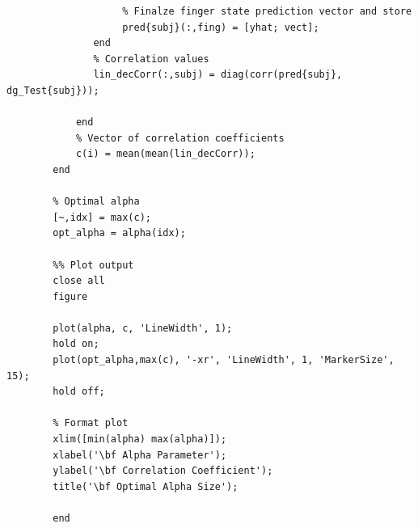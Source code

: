 \documentclass{article}
\begin{document}
\begin{lstlisting}
		            % Finalze finger state prediction vector and store
		            pred{subj}(:,fing) = [yhat; vect];
		       end
		       % Correlation values
		       lin_decCorr(:,subj) = diag(corr(pred{subj}, dg_Test{subj})); 
		       
		    end
		    % Vector of correlation coefficients
			c(i) = mean(mean(lin_decCorr));
		end

		% Optimal alpha 
		[~,idx] = max(c);
		opt_alpha = alpha(idx);

		%% Plot output
		close all
		figure

		plot(alpha, c, 'LineWidth', 1);
		hold on;
		plot(opt_alpha,max(c), '-xr', 'LineWidth', 1, 'MarkerSize', 15);
		hold off;

		% Format plot
		xlim([min(alpha) max(alpha)]);
		xlabel('\bf Alpha Parameter');
		ylabel('\bf Correlation Coefficient');
		title('\bf Optimal Alpha Size');

		end
	\end{lstlisting}
\end{document}
